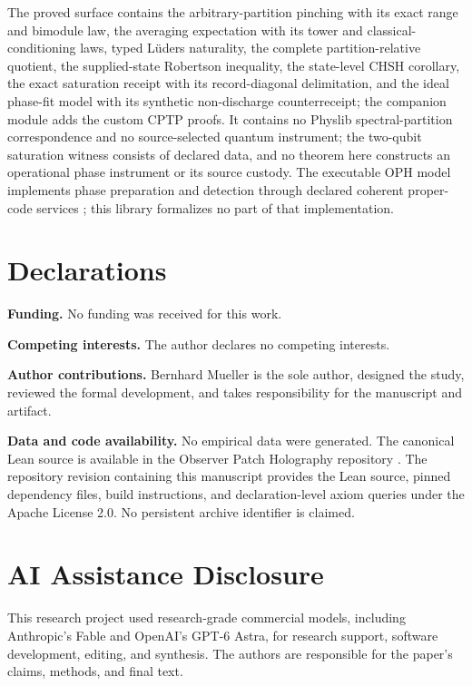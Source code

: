 \documentclass[11pt]{article}
\renewcommand{\_}{\textunderscore\allowbreak}
\theoremstyle{remark}
\begin{document}
The proved surface contains the arbitrary-partition pinching with its exact
range and bimodule law, the averaging expectation with its tower and
classical-conditioning laws, typed L\"uders naturality, the complete
partition-relative quotient, the supplied-state Robertson inequality, the
state-level CHSH corollary, the exact saturation receipt with its
record-diagonal delimitation, and the ideal phase-fit model with its synthetic
non-discharge counterreceipt; the
companion module adds the custom CPTP proofs.
It contains no Physlib
spectral-partition correspondence and no source-selected quantum instrument;
the two-qubit saturation witness consists of declared data, and no theorem
here constructs an operational phase instrument or its source custody. The
executable OPH model implements phase preparation and detection through
declared coherent proper-code services \cite{ophinterface}; this library
formalizes no part of that implementation.

\section*{Declarations}

\textbf{Funding.} No funding was received for this work.

\textbf{Competing interests.} The author declares no competing interests.

\textbf{Author contributions.} Bernhard Mueller is the sole author, designed
the study, reviewed the formal development, and takes responsibility for the
manuscript and artifact.

\textbf{Data and code availability.} No empirical data were generated. The
canonical Lean source is available in the Observer Patch Holography
repository \cite{observerPatchHolographyRepo}. The repository revision
containing this manuscript provides the Lean source, pinned dependency files,
build instructions, and declaration-level axiom queries under the Apache
License 2.0. No persistent archive identifier is claimed.




\section*{AI Assistance Disclosure}
This research project used research-grade commercial models, including
Anthropic's Fable and OpenAI's GPT-6 Astra, for research support, software
development, editing, and synthesis. The authors are responsible for the
paper's claims, methods, and final text.
\end{document}
